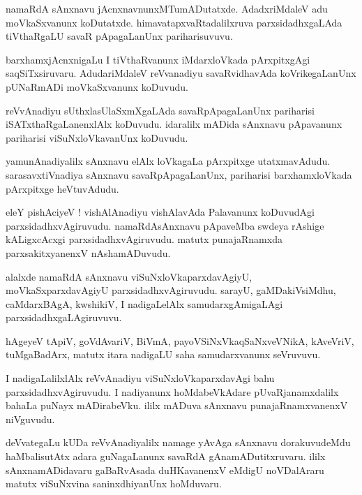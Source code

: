 \documentclass{article}
\begin{document}
\begin{mn}
namaRdA sAnxnavu jAcnxnavnunxMTumADutatxde. AdadxriMdaleV adu moVkaSxvanunx koDutatxde. 
himavatapxvaRtadalilxruva parxsidadhxgaLAda tiVthaRgaLU savaR pApagaLanUnx pariharisuvuvu.
\end{mn}

\begin{mn}
barxhamxjAcnxnigaLu I tiVthaRvanunx iMdarxloVkada pArxpitxgAgi saqSiTxsiruvaru. AdudariMdaleV 
reVvanadiyu savaRvidhavAda koVrikegaLanUnx pUNaRmADi moVkaSxvanunx koDuvudu.
\end{mn}

\begin{mn}
reVvAnadiyu sUthxlasUlaSxmXgaLAda savaRpApagaLanUnx  pariharisi iSATxthaRgaLanenxlAlx koDuvudu.
idaralilx  mADida sAnxnavu pApavanunx pariharisi viSuNxloVkavanUnx koDuvudu.
\end{mn}

\begin{mn}
yamunAnadiyalilx sAnxnavu elAlx loVkagaLa pArxpitxge utatxmavAdudu. sarasavxtiVnadiya sAnxnavu 
savaRpApagaLanUnx, pariharisi barxhamxloVkada pArxpitxge heVtuvAdudu.
\end{mn}

\begin{mn}
eleY pishAciyeV ! vishAlAnadiyu vishAlavAda Palavanunx koDuvudAgi parxsidadhxvAgiruvudu. 
namaRdAsAnxnavu pApaveMba swdeya rAshige kALigxcAcxgi parxsidadhxvAgiruvudu. matutx punajaRnamxda 
parxsakitxyanenxV nAshamADuvudu.
\end{mn}

\begin{mn}
alalxde namaRdA sAnxnavu viSuNxloVkaparxdavAgiyU, moVkaSxparxdavAgiyU parxsidadhxvAgiruvudu. sarayU,
gaMDakiVsiMdhu, caMdarxBAgA, kwshikiV, I nadigaLelAlx samudarxgAmigaLAgi parxsidadhxgaLAgiruvuvu.
\end{mn}

\begin{mn}
hAgeyeV tApiV, goVdAvariV, BiVmA, payoVSiNxVkaqSaNxveVNikA, kAveVriV, tuMgaBadArx, matutx itara
nadigaLU saha samudarxvanunx seVruvuvu.
\end{mn}

\begin{mn}
I nadigaLalilxlAlx reVvAnadiyu viSuNxloVkaparxdavAgi bahu parxsidadhxvAgiruvudu. I nadiyanunx 
hoMdabeVkAdare pUvaRjanamxdalilx bahaLa puNayx mADirabeVku. ililx mADuva sAnxnavu 
punajaRnamxvanenxV niVguvudu.
\end{mn}

\begin{mn}
deVvategaLu kUDa reVvAnadiyalilx namage yAvAga sAnxnavu dorakuvudeMdu haMbalisutAtx adara 
guNagaLanunx  savaRdA gAnamADutitxruvaru. ililx sAnxnamADidavaru gaBaRvAsada duHKavanenxV eMdigU 
noVDalAraru matutx viSuNxvina saninxdhiyanUnx hoMduvaru.
\end{mn}
\end{document}

